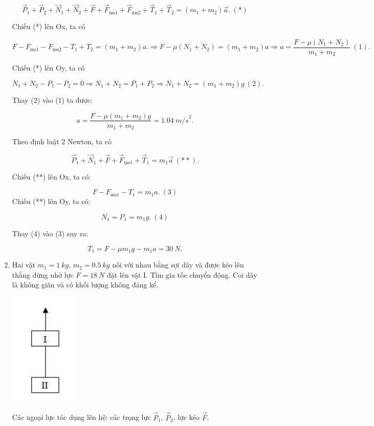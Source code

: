 \begin{enumerate}[label=\bfseries Bài \arabic*:]
{	$$\vec P_1 + \vec P_2 + \vec N_1 + \vec N_2 + \vec F + \vec F_\text{ms1} + \vec F_\text{ms2} + \vec T_1 + \vec T_2 = (m_1 + m_2)\vec a.\ (*)$$
	
	Chiếu (*) lên Ox, ta có
	
	$$F - F_\text{ms1} - F_\text{ms2} - T_1 + T_2 = (m_1 + m_2)a. \Rightarrow F - \mu(N_1 + N_2) = (m_1 + m_2)a\Rightarrow a = \dfrac{F - \mu (N_1 + N_2)}{m_1+m_2}\ (1).$$
	
	Chiếu (*) lên Oy, ta có
	
	$$N_1 + N_2 - P_1 - P_2 =0 \Rightarrow N_1 + N_2 = P_1 + P_2 \Rightarrow N_1 + N_2 = (m_1 + m_2)g\ (2).$$
	
	Thay (2) vào (1) ta được:
	
	$$a = \dfrac{F - \mu (m_1 + m_2)g}{m_1+m_2}= \SI{1,04}{m/s}^2.$$
	
	Theo định luật 2 Newton, ta có
	
	$$\vec P_1 + \vec N_1 + \vec F + \vec F_\text{ms1} + \vec T_1 = m_1 \vec a\ (**).$$
	
	Chiếu (**) lên Ox, ta có:
	
	$$F - F_\text{ms1} - T_1 = m_1a.\ (3)$$
	Chiếu (**) lên Oy, ta có:
	
	$$N_1 = P_1 = m_1g. \ (4)$$
	
	Thay (4) vào (3) suy ra:
	
	$$T_1 = F - \mu m_1 g - m_1 a  = \SI{30}{N}.$$
	
	
}

\item {}


{
	Hai vật $m_1 = \SI{1}{kg}$, $m_2 = \SI{0,5}{kg}$ nối với nhau bằng sợi dây và được kéo lên thẳng đứng nhờ lực $F = \SI{18}{N}$ đặt lên vật I. Tìm gia tốc chuyển động. Coi dây là không giãn và có khối lượng không đáng kể.
	\begin{center}
		\includegraphics[scale=0.8]{../figs/VN10-2022-PH-TP021-8.jpg}
	\end{center}
}

\hideall
{
	Các ngoại lực tác dụng lên hệ: các trọng lực $\vec P_1$, $\vec P_2$, lực kéo $\vec F$.
	
}
\end{enumerate}
